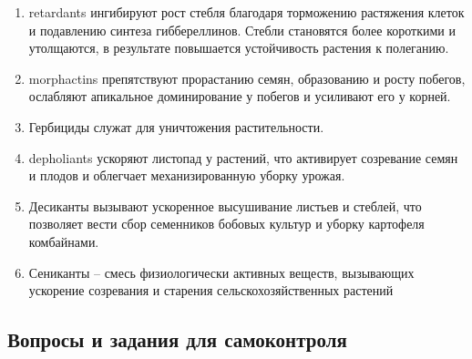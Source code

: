 \begin{enumerate}

\item \gls{retardants} ингибируют рост стебля благодаря торможению растяжения клеток и подавлению синтеза гиббереллинов. Стебли становятся более короткими и утолщаются, в результате повышается устойчивость растения к полеганию.
\item \gls{morphactins} препятствуют прорастанию семян, образованию и росту побегов, ослабляют апикальное доминирование у побегов и усиливают его у корней.
\item Гербициды служат для уничтожения растительности. 
\item \gls{depholiants} ускоряют листопад у растений, что активирует созревание семян и плодов и облегчает механизированную уборку урожая.
\item Десиканты вызывают ускоренное высушивание листьев и стеблей, что позволяет вести сбор семенников бобовых культур и уборку картофеля комбайнами.
\item Сениканты – смесь физиологически активных веществ, вызывающих ускорение созревания и старения сельскохозяйственных растений

\end{enumerate}

\subsection*{Вопросы и задания для самоконтроля}

